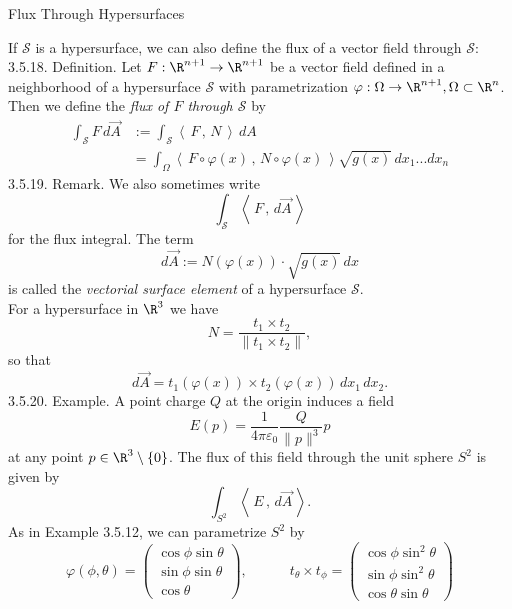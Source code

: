 \documentclass[smaller,hyperref={CJKbookmarks=true}]{beamer}
\newcommand{\scp}[2]{\left\langle\,#1\,,\,#2\,\right\rangle} \newcommand{\scpp}{\langle\,\cdot\,,\,\cdot\,\rangle}
\begin{document}
\begin{frame}{Flux Through Hypersurfaces}
\begin{spacing}{1}
\vspace*{13pt}
If $\mathcal{S}$ is a hypersurface, we can also define the flux of a vector field through
$\mathcal{S}$:\\[5pt]
\alert{3.5.18. Definition.} Let $F:\R^{n+1}\to\R^{n+1}$ be a vector field defined in a neighborhood
of a hypersurface $\mathcal{S}$ with parametrization $\varphi:\Omega\to\R^{n+1},\Omega\subset\R^n$. Then we define the \emph{flux of $F$ through $\mathcal{S}$} by
\begin{equation*}
  \begin{split}
     \int_\mathcal{S}F\,d\vec{A} &:=\int_\mathcal{S}\scp{F}{N}\,dA \\
       &=\int_\Omega\scp{F\circ\varphi(x)}{N\circ\varphi(x)}\sqrt{g(x)}\,dx_1...dx_n
  \end{split}
\end{equation*}
\newpage
\alert{3.5.19. Remark.} We also sometimes write
\[\int_\mathcal{S}\scp{F}{d\vec{A}}\]
for the flux integral. The term
\[d\vec{A}:=N(\varphi(x))\cdot\sqrt{g(x)}\,dx\]
is called the \emph{vectorial surface element} of a hypersurface $\mathcal{S}$.\\[5pt]
For a hypersurface in $\R^3$ we have
\[N=\frac{t_1\times t_2}{\|t_1\times t_2\|},\]
so that
\[d\vec{A}=t_1(\varphi(x))\times t_2(\varphi(x))\,dx_1\,dx_2.\]
\newpage
\alert{3.5.20. Example.} A point charge $Q$ at the origin induces a field
\[E(p)=\frac{1}{4\pi\varepsilon_0}\frac{Q}{\|p\|^3}p\]
at any point $p\in\R^3\setminus\{0\}$. The flux of this field through the unit sphere $S^2$ is given by
\[\int_{S^2}\scp{E}{d\vec{A}}.\]
As in Example 3.5.12, we can parametrize $S^2$ by
\[\varphi(\phi,\theta)=\begin{pmatrix}
                         \cos\phi\sin\theta \\
                         \sin\phi\sin\theta \\
                         \cos\theta
                       \end{pmatrix},\qquad\quad
t_\theta\times t_\phi=\begin{pmatrix}
                        \cos\phi\sin^2\theta \\
                        \sin\phi\sin^2\theta \\
                        \cos\theta\sin\theta
                      \end{pmatrix}\]

\end{spacing}
\end{frame}
\end{document}
